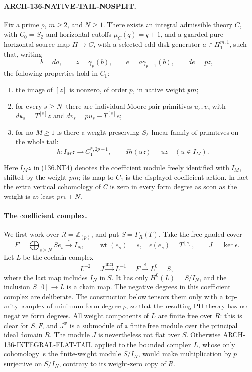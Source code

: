 \paragraph{ARCH-136-NATIVE-TAIL-NOSPLIT.}
Fix a prime \(p\), \(m\geq2\), and \(N\geq1\).
There exists an integral admissible theory \(C\), with
\(C_0=S_{\mathbb Z}\) and horizontal cutoffs \(\mu_C(q)=q+1\),
and a guarded pure horizontal source map \(H\to C\), with a
selected odd disk generator \(a\in H_1^{m,1}\), such that, writing
\[
       b=da,\qquad z=\gamma_p(b),\qquad
       e=a\gamma_{p-1}(b),\qquad de=pz,                 \tag{136.NT3}
\]
the following properties hold in \(C_1\):
\begin{enumerate}
\item the image of \([z]\) is nonzero, of order \(p\), in native
weight \(pm\);
\item for every \(s\geq N\), there are individual Moore-pair
primitives \(u_s,v_s\) with
\(du_s=T^{[s]}z\) and \(dv_s=pu_s-T^{[s]}e\);
\item for no \(M\geq1\) is there a weight-preserving
\(S_{\mathbb Z}\)-linear family of primitives on the whole tail:
\[
 h:I_M z\longrightarrow C_1^{*,2p-1},\qquad dh(u z)=u z
                          \quad(u\in I_M).
                                                        \tag{136.NT4}
\]
\end{enumerate}
Here \(I_Mz\) in (136.NT4) denotes the coefficient module freely
identified with \(I_M\), shifted by the weight \(pm\); its map
to \(C_1\) is the displayed coefficient action. In fact the
extra vertical cohomology of \(C\) is zero in every form degree
as soon as the weight is at least \(pm+N\).

\paragraph{The coefficient complex.}
We first work over \(R=\mathbb Z_{(p)}\), and put
\(S=\Gamma_R(T)\). Take the free graded cover
\[
 F=\bigoplus_{s\geq N}S e_s\xrightarrow{\epsilon}I_N,
 \qquad\operatorname{wt}(e_s)=s,\quad
 \epsilon(e_s)=T^{[s]},\qquad J=\ker\epsilon.
                                                        \tag{136.NT5}
\]
Let \(L\) be the cochain complex
\[
       L^{-2}=J\xrightarrow{\mathrm{incl}}L^{-1}=F
          \xrightarrow{\epsilon}L^0=S,                 \tag{136.NT6}
\]
where the last map includes \(I_N\) in \(S\).
It has only \(H^0(L)=S/I_N\), and the inclusion
\(S[0]\to L\) is a chain map. The negative degrees in this
coefficient complex are deliberate. The construction below tensors
them only with a top-arity complex of minimum form degree \(p\),
so that the resulting PD theory has no negative form degrees.
All weight components of \(L\) are finite free over \(R\):
this is clear for \(S,F\), and \(J^w\) is a submodule of a finite
free module over the principal ideal domain \(R\).
The module \(J\) is nevertheless not flat over \(S\).
Otherwise ARCH-136-INTEGRAL-FLAT-TAIL applied to the bounded
complex \(L\), whose only cohomology is the finite-weight module
\(S/I_N\), would make multiplication by \(p\) surjective on
\(S/I_N\), contrary to its weight-zero copy of \(R\).

